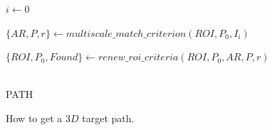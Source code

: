 \begin{algorithm}
 $i \leftarrow 0$ \;
\\
{
    $\{AR,P,r\} \leftarrow multiscale\_match\_criterion(ROI,P_0,I_i)$\;
    
    $\{ROI,P_0,Found\} \leftarrow renew\_roi\_criteria(ROI,P_0,AR,P,r)$\;
}
\\
\Return PATH \;
\caption{How to get a $3D$ target path.}
\label{alg:system}
\end{algorithm}


